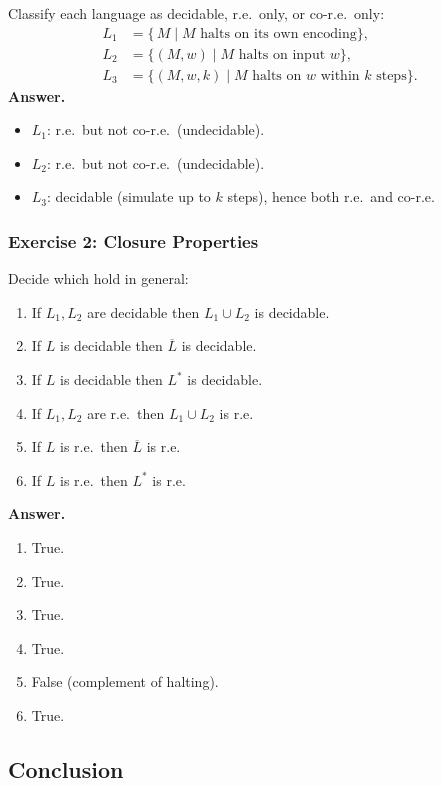 \documentclass{article}
\theoremstyle{theorem}
\theoremstyle{definition}
\theoremstyle{remark}
\begin{document}
Classify each language as decidable, r.e.\ only, or co-r.e.\ only:
\[
\begin{aligned}
L_1 &= \{\,M \mid M\text{ halts on its own encoding}\},\\
L_2 &= \{(M,w)\mid M\text{ halts on input }w\},\\
L_3 &= \{(M,w,k)\mid M\text{ halts on }w\text{ within }k\text{ steps}\}.
\end{aligned}
\]
\textbf{Answer.}
\begin{itemize}
  \item \(L_1\): r.e.\ but not co-r.e.\ (undecidable).
  \item \(L_2\): r.e.\ but not co-r.e.\ (undecidable).
  \item \(L_3\): decidable (simulate up to \(k\) steps), hence both r.e.\ and co-r.e.
\end{itemize}

\subsubsection*{Exercise 2: Closure Properties}

Decide which hold in general:
\begin{enumerate}
  \item If \(L_1,L_2\) are decidable then \(L_1\cup L_2\) is decidable.
  \item If \(L\) is decidable then \(\overline L\) is decidable.
  \item If \(L\) is decidable then \(L^*\) is decidable.
  \item If \(L_1,L_2\) are r.e.\ then \(L_1\cup L_2\) is r.e.
  \item If \(L\) is r.e.\ then \(\overline L\) is r.e.
  \item If \(L\) is r.e.\ then \(L^*\) is r.e.
\end{enumerate}
\textbf{Answer.}
\begin{enumerate}
  \item True.
  \item True.
  \item True.
  \item True.
  \item False (complement of halting).
  \item True.
\end{enumerate}

\subsection*{Conclusion}
\end{document}
